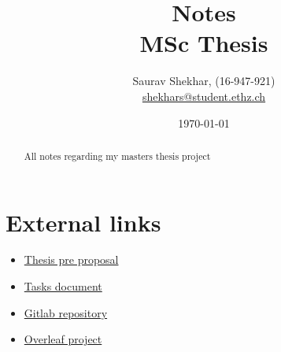 \documentclass[letterpaper]{article}
\title{
  {\bf Notes }\\
\large MSc Thesis }
\author{Saurav Shekhar, (16-947-921)\\
\href{mailto:shekhars@student.ethz.ch}{shekhars@student.ethz.ch}}
\date{\today}
\def\biblio{\newpage}
\begin{document}
\def\biblio{}
\maketitle
\begin{abstract}
  All notes regarding my masters thesis project
\end{abstract}

\section{External links}
\begin{itemize}
  \item \href{https://docs.google.com/document/d/1GMczTKs5-JKIgxfFOKv1yJNKLoUHZ0pqwR15xZcgyYQ/edit?usp=sharing}{Thesis pre proposal}
  \item \href{https://docs.google.com/document/d/1Ytcuj1QJ8Xs5gzXVYbvcsjwsGGyz7HEg0_nCRAXjbgg/edit}{Tasks document}
  \item \href{https://gitlab.ethz.ch/shekhars/msc-thesis}{Gitlab repository} 
  \item \href{https://www.overleaf.com/9925566564xbszbcfbycnd}{Overleaf project} 
\end{itemize}

 \newpage

 \newpage

 \newpage

\newpage


\end{document}
